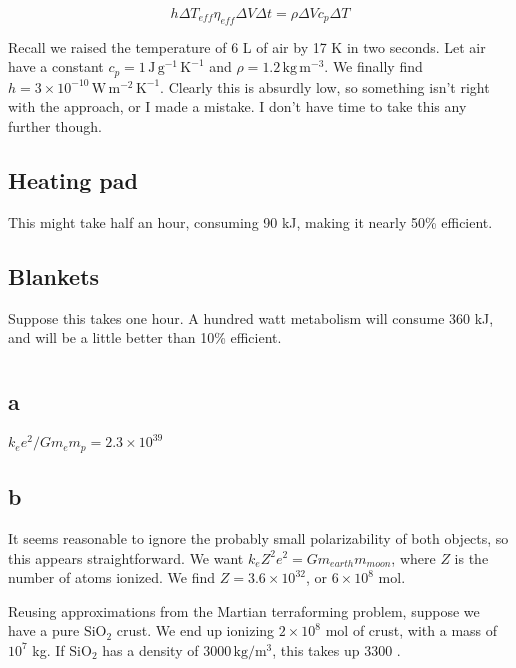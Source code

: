 \documentclass[12pt]{article}
\begin{document}
\[ h \Delta T_{eff} \eta_{eff} \Delta V \Delta t = \rho \Delta V c_p\Delta T
\]


Recall we raised the temperature of 6 L of air by 17 K in two seconds. Let air have a constant \(c_p = 1 \,\mathrm{J}\,\mathrm{g}^{-1}\,\mathrm{K}^{-1}\) and \(\rho = 1.2 \,\mathrm{kg}\,\mathrm{m}^{-3}\). We finally find \(h = 3\times 10^{-10}\,\mathrm{W}\,\mathrm{m}^{-2}\,\mathrm{K}^{-1}\). Clearly this is absurdly low, so something isn't right with the approach, or I made a mistake. I don't have time to take this any further though.

\subsection{Heating pad}

This might take half an hour, consuming 90 kJ, making it nearly 50\% efficient.

\subsection{Blankets}

Suppose this takes one hour. A hundred watt metabolism will consume 360 kJ, and will be a little better than 10\% efficient.


\section{}

\subsection*{a}

\(k_ee^2/Gm_em_{p} = 2.3 \times 10^{39}\)

\subsection*{b}

It seems reasonable to ignore the probably small polarizability of both objects, so this appears straightforward. We want \(k_e Z^2 e^2 = Gm_{earth}m_{moon}\), where \(Z\) is the number of atoms ionized. We find \(Z=3.6\times 10^{32}\), or \(6 \times 10^8\) mol.

Reusing approximations from the Martian terraforming problem, suppose we have a pure \(\mathrm{Si}\mathrm{O}_2\) crust. We end up ionizing \(2\times 10^8\) mol of crust, with a mass of \(10^7\) kg. If \(\mathrm{Si}\mathrm{O}_2\) has a density of \(3000 \,\mathrm{kg}/\mathrm{m}^3\), this takes up 3300 \mcb.
\end{document}
